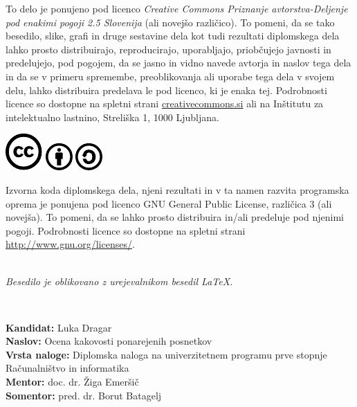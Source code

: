 \documentclass[a4paper,12pt,openright]{book}
\newcommand{\clearemptydoublepage}{\newpage{\pagestyle{empty}\cleardoublepage}}
\newcommand{\CcImageCc}[1]{%
	\includegraphics[scale=#1]{cc_cc_30.pdf}%
}
\newcommand{\CcImageBy}[1]{%
	\includegraphics[scale=#1]{cc_by_30.pdf}%
}
\newcommand{\CcImageSa}[1]{%
	\includegraphics[scale=#1]{cc_sa_30.pdf}%
}
\begin{document}
\newpage
\thispagestyle{empty}

\vspace*{5cm}
{\small \noindent
To delo je ponujeno pod licenco \textit{Creative Commons Priznanje avtorstva-Deljenje pod enakimi pogoji 2.5 Slovenija} (ali novej\v so razli\v cico).
To pomeni, da se tako besedilo, slike, grafi in druge sestavine dela kot tudi rezultati diplomskega dela lahko prosto distribuirajo,
reproducirajo, uporabljajo, priobčujejo javnosti in predelujejo, pod pogojem, da se jasno in vidno navede avtorja in naslov tega
dela in da se v primeru spremembe, preoblikovanja ali uporabe tega dela v svojem delu, lahko distribuira predelava le pod
licenco, ki je enaka tej.
Podrobnosti licence so dostopne na spletni strani \href{http://creativecommons.si}{creativecommons.si} ali na Inštitutu za
intelektualno lastnino, Streliška 1, 1000 Ljubljana.

\vspace*{1cm}
\begin{center}%
\CcImageCc{0.741573033707865}\hspace*{1ex}\CcImageBy{1}\hspace*{1ex}\CcImageSa{1}%
\end{center}
}

\vspace*{1cm}
{\small \noindent
Izvorna koda diplomskega dela, njeni rezultati in v ta namen razvita programska oprema je ponujena pod licenco GNU General Public License,
različica 3 (ali novejša). To pomeni, da se lahko prosto distribuira in/ali predeluje pod njenimi pogoji.
Podrobnosti licence so dostopne na spletni strani \url{http://www.gnu.org/licenses/}.
}

\vfill
\begin{center} 
\ \\ \vfill
{\em
Besedilo je oblikovano z urejevalnikom besedil \LaTeX.}
\end{center}

\clearemptydoublepage

\thispagestyle{empty}
\
\vfill

\bigskip
\noindent\textbf{Kandidat:} Luka Dragar\\
\noindent\textbf{Naslov:} Ocena kakovosti ponarejenih posnetkov\\
\noindent\textbf{Vrsta naloge:} Diplomska naloga na univerzitetnem programu prve stopnje Računalništvo in informatika \\
\noindent\textbf{Mentor:} doc. dr. Žiga Emeršič\\
\noindent\textbf{Somentor:} pred. dr. Borut Batagelj
\end{document}
